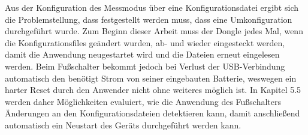 Aus der Konfiguration des Messmodus über eine Konfigurationsdatei ergibt sich die Problemstellung, dass festgestellt werden muss, dass eine Umkonfiguration durchgeführt wurde. Zum Beginn dieser Arbeit muss der Dongle jedes Mal, wenn die Konfigurationsfiles geändert wurden, ab- und wieder eingesteckt werden, damit die Anwendung neugestartet wird und die Dateien erneut eingelesen werden. Beim Fußschalter bekommt jedoch bei Verlust der \ac{USB}-Verbindung automatisch den benötigt Strom von seiner eingebauten Batterie, weswegen ein harter Reset durch den Anwender nicht ohne weiteres möglich ist. In Kapitel 5.5 werden daher Möglichkeiten evaluiert, wie die Anwendung des Fußschalters Änderungen an den Konfigurationsdateien detektieren kann, damit anschließend automatisch ein Neustart des Geräts durchgeführt werden kann.

